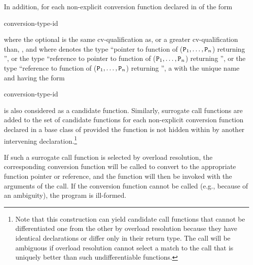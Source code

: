 \pnum
In addition, for each non-explicit conversion function declared in  of the
form
\begin{ncsimplebnf}
 conversion-type-id \terminal{(\,)}     \terminal{;}
\end{ncsimplebnf}
where the optional
is the same cv-qualification as, or a greater cv-qualification than,
\cv{},
and where
denotes the type ``pointer to function
of ($\texttt{P}_1, \dotsc, \texttt{P}_n$) returning '',
or the type ``reference to pointer to function
of ($\texttt{P}_1, \dotsc, \texttt{P}_n$) returning '',
or the type
``reference to function of ($\texttt{P}_1, \dotsc, \texttt{P}_n$)
returning '', a  with the unique name
and having the form
\begin{ncbnf}
  \terminal{(} conversion-type-id \ %
 
\end{ncbnf}
is also considered as a candidate function.
Similarly, surrogate
call functions are added to the set of candidate functions for
each non-explicit conversion function declared in a base class of
provided the function is not hidden within
by another
intervening declaration.\footnote{Note that this construction can yield
candidate call functions that cannot be
differentiated one from the other by overload resolution because they have
identical
declarations or differ only in their return type.
The call will be ambiguous
if overload
resolution cannot select a match to the call that is uniquely better than such
undifferentiable functions.}

\pnum
If such a surrogate call function is selected by overload
resolution, the corresponding conversion function will be called to convert
to the appropriate function pointer or reference, and the function
will then be invoked with the arguments of the call. If the
conversion function cannot be called (e.g., because of an ambiguity),
the program is ill-formed.

